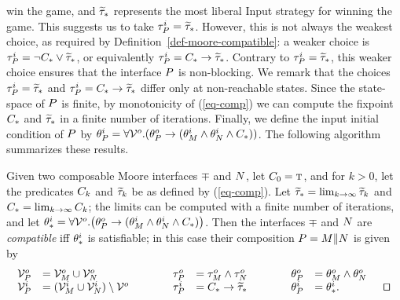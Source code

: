 win the game, and $\widetilde{\tau}_*$ represents the most liberal Input 
strategy %
for winning the game.
This suggests us to take $\tau^i_P = \widetilde{\tau}_*$.
However, this is not always the weakest choice, as required by
Definition~\ref{def-moore-compatible}:   
a weaker choice is $\tau^i_P = \neg C_* \vee \widetilde{\tau}_*$,
or equivalently $\tau^i_P = C_* \rightarrow \widetilde{\tau}_*$. 
Contrary to $\tau^i_P = \widetilde{\tau}_*$, this weaker choice ensures
that the interface $P$ is non-blocking.
We remark that the choices $\tau^i_P = \widetilde{\tau}_*$
and $\tau^i_P = C_* \rightarrow \widetilde{\tau}_*$ differ only at non-reachable
states. 
Since the state-space of $P$ is finite, 
by monotonicity of (\ref{eq-comp}) we can compute the fixpoint 
$C_*$ and $\widetilde{\tau}_*$ in a finite number of iterations. 
Finally, we define the input initial condition of $P$ by 
$
  \theta^i_P = \forall {\cal V}^o . 
  ( \theta^o_P \rightarrow (\theta^i_M \wedge \theta^i_N \wedge C_*) )
$. 
The following algorithm summarizes these results. 

\begin{algo}{}
Given two composable Moore interfaces $\mp$ and $N$, let 
$C_0 = \mbox{\sc t}$, and for $k > 0$, let the predicates $C_k$ and
$\widetilde{\tau}_k$ be as defined by (\ref{eq-comp}). 
Let 
$\widetilde{\tau}_* = \lim_{k \rightarrow \infty} \widetilde{\tau}_k$ and 
$C_* = \lim_{k \rightarrow \infty} C_k$; 
the limits can be computed with a finite number of iterations,
and let $\theta^i_* = \forall {\cal V}^o . 
\bigl( \theta^o_P \rightarrow (\theta^i_M \wedge \theta^i_N \wedge C_*) \bigr)$.
Then the interfaces $\mp$ and $N$ are {\em compatible} iff $\theta^i_*$
is satisfiable; in this case their composition $P = M \| N$ is given by 
\[
\begin{array}{rlcrlcrl}
\ovars_\mr  & = \ovars_\mp \union \ovars_\mq & \hspace*{2em} & 
\otrans_\mr & = \otrans_\mp \und \otrans_\mq & \hspace*{2em} & 
\oinit_\mr  & = \oinit_\mp \und \oinit_\mq \\
%
\ivars_\mr  & = (\ivars_\mp \union \ivars_\mq) \setm \ovars & \hspace*{2em} & 
\itrans_\mr & = \ctrl_* \im \htau_* & \hspace*{2em} &
\iinit_\mr  & = \iinit_*. \hspace{4em} \qed
\end{array}
\]
\end{algo}



